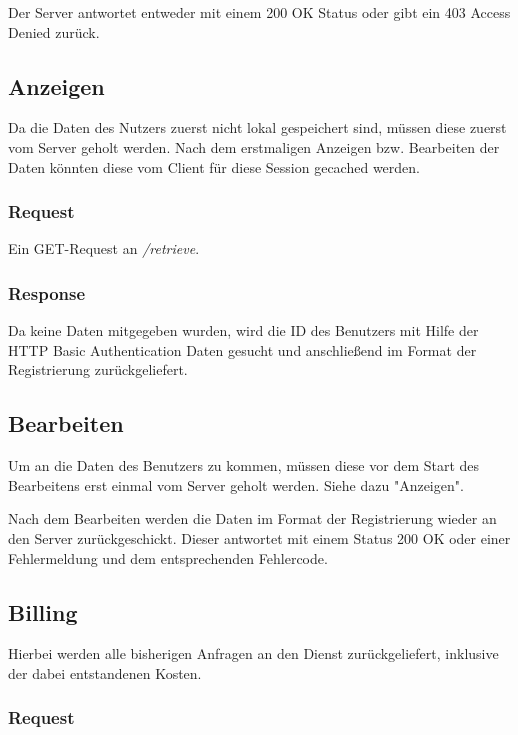 \documentclass[ngerman]{scrartcl}
\begin{document}
		Der Server antwortet entweder mit einem 200 OK Status oder gibt ein 403 Access Denied zurück.
		
	\subsection{Anzeigen}
	
	Da die Daten des Nutzers zuerst nicht lokal gespeichert sind, müssen diese zuerst vom Server geholt werden. Nach dem erstmaligen Anzeigen bzw. Bearbeiten der Daten könnten diese vom Client für diese Session gecached werden.
	
		\subsubsection*{Request}
		
		Ein GET-Request an \textit{/retrieve}.
		
		\subsubsection*{Response}
		
		Da keine Daten mitgegeben wurden, wird die ID des Benutzers mit Hilfe der HTTP Basic Authentication Daten gesucht und anschließend im Format der Registrierung zurückgeliefert.
		
	\subsection{Bearbeiten}

	Um an die Daten des Benutzers zu kommen, müssen diese vor dem Start des Bearbeitens erst einmal vom Server geholt werden. Siehe dazu "Anzeigen".
	
	Nach dem Bearbeiten werden die Daten im Format der Registrierung wieder an den Server zurückgeschickt. Dieser antwortet mit einem Status 200 OK oder einer Fehlermeldung und dem entsprechenden Fehlercode.
	
	\subsection{Billing}
	
	Hierbei werden alle bisherigen Anfragen an den Dienst zurückgeliefert, inklusive der dabei entstandenen Kosten.
	
		\subsubsection*{Request}
		
\end{document}
